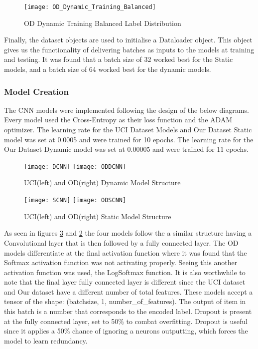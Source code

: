 \begin{figure}[H]
\centering
\texttt{[image: OD\_Dynamic\_Training\_Balanced]}\hfill
\caption{OD Dynamic Training Balanced Label Distribution}
\label{fig:Balanced_Train}
\end{figure}

Finally, the dataset objects are used to initialise a Dataloader object.
This object gives us the functionality of delivering batches as inputs to the models at training and testing.
It was found that a batch size of 32 worked best for the Static models, and a batch size of 64 worked best for the dynamic models.

\subsubsection{Model Creation}
The CNN models were implemented following the design of the below diagrams.
Every model used the Cross-Entropy as their loss function and the ADAM optimizer.
The learning rate for the UCI Dataset Models and Our Dataset Static model was set at 0.0005 and were trained for 10 epochs.
The learning rate for the Our Dataset Dynamic model was set at 0.00005 and were trained for 11 epochs.

\begin{figure}[H]
\centering
\texttt{[image: DCNN]}\hfill
\texttt{[image: ODDCNN]}\hfill
\caption{UCI(left) and OD(right) Dynamic Model Structure}
\label{fig:Dynamic_Models}
\end{figure}

\begin{figure}[H]
\centering
\texttt{[image: SCNN]}\hfill
\texttt{[image: ODSCNN]}\hfill
\caption{UCI(left) and OD(right) Static Model Structure}
\label{fig:Static_Models}
\end{figure}

As seen in figures \ref{fig:Static_Models} and \ref{fig:Dynamic_Models} the four models follow the a similar structure having a Convolutional layer that is then followed by a fully connected layer.
The OD models differentiate at the final activation function where it was found that the Softmax activation function was not activating properly.
Seeing this another activation function was used, the LogSoftmax function.
It is also worthwhile to note that the final layer fully connected layer is different since the UCI dataset and Our dataset have a different number of total features.
These models accept a tensor of the shape: (batchsize, 1, number\_of\_features).
The output of item in this batch is a number that corresponds to the encoded label.
Dropout is present at the fully connected layer, set to 50\% to combat overfitting.
Dropout is useful since it applies a 50\% chance of ignoring a neurons outputting, which forces the model to learn redundancy.